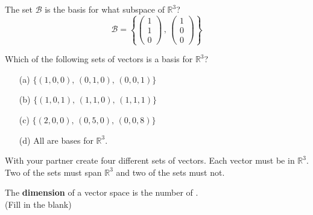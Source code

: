 \begin{problem}
    The set $\mathcal{B}$ is the basis for what subspace of $\mathbb{R}^3$?
    \[ \mathcal{B} = \left\{ \begin{pmatrix} 1 \\ 1 \\ 0\end{pmatrix} \, , \,
    \begin{pmatrix} 1 \\ 0 \\ 0 \end{pmatrix} \right\} \]
\end{problem}


\begin{problem}
    Which of the following sets of vectors is a basis for $\mathbb{R}^3$?
    \begin{enumerate}
        \item[(a)] $\{(1,0,0), \, (0,1,0), \, (0,0,1) \}$
        \item[(b)] $\{(1,0,1), \, (1,1,0), \, (1,1,1) \}$
        \item[(c)] $\{(2,0,0), \, (0,5,0), \, (0,0,8) \}$
        \item[(d)] All are bases for $\mathbb{R}^3$.
    \end{enumerate}
\end{problem}

%         

\begin{problem}
    With your partner create four different sets of vectors.  Each vector must be in $\mathbb{R}^3$.
    Two of the sets must span $\mathbb{R}^3$ and two of the sets must not.
\end{problem}


%             



\begin{definition}
    The {\bf dimension} of a vector space is the number of
            \underline{\hspace{1in}}. \\ (Fill in the blank)
\end{definition}

